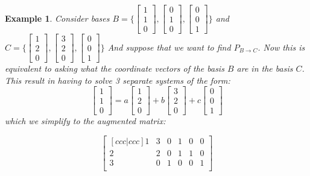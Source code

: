 \documentclass[titlepage]{article}
\newtheorem{exm}{Example}[subsection]
\numberwithin{equation}{subsection}
\begin{document}
\begin{exm}
Consider bases $B= \{ \begin{bmatrix}
    1\\
    1\\
    0
\end{bmatrix}, \begin{bmatrix}
    0\\
    1\\
    0
\end{bmatrix}, \begin{bmatrix}
    0\\
    0\\
    1
\end{bmatrix} \}$ and $C= \{ \begin{bmatrix}
    1\\
    2\\
    0
\end{bmatrix}, \begin{bmatrix}
    3\\
    2\\
    0
\end{bmatrix}, \begin{bmatrix}
    0\\
    0\\
    1
\end{bmatrix} \}$ And suppose that we want to find $P_{B\to C}$. Now this is equivalent to asking what the coordinate vectors of the basis $B$ are in the basis $C$. This result in having to solve 3 separate systems of the form:
$$ \begin{bmatrix}
    1\\
    1\\
    0
\end{bmatrix} = a\begin{bmatrix}
    1\\
    2\\
    0
\end{bmatrix} + b\begin{bmatrix}
    3\\
    2\\
    0
\end{bmatrix} + c\begin{bmatrix}
    0\\
    0\\
    1
\end{bmatrix}$$ which we simplify to the augmented matrix:

$$
  \begin{bmatrix}[ccc|ccc]
   1 & 3 & 0 & 1 & 0 & 0\\
   2 & 2 & 0 & 1 & 1 & 0\\
   3 & 0 & 1 & 0 & 0 & 1\\
\end{bmatrix}
$$
\end{exm}
\end{document}
